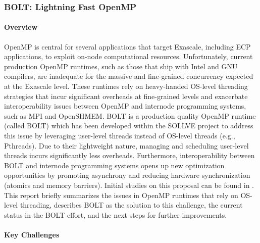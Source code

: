 \subsubsection{ BOLT: Lightning Fast OpenMP}\label{subsubsect:bolt}

\paragraph{Overview}

OpenMP is central for several applications that target Exascale,
including ECP applications, to exploit on-node computational
resources.  Unfortunately, current production OpenMP runtimes, such as
those that ship with Intel and GNU compilers, are inadequate for the
massive and fine-grained concurrency expected at the Exascale level.
These runtimes rely on heavy-handed OS-level threading strategies that
incur significant overheads at fine-grained levels and exacerbate
interoperability issues between OpenMP and internode programming
systems, such as MPI and OpenSHMEM.  BOLT is a production quality
OpenMP runtime (called BOLT) which has been developed within the
SOLLVE project to address this issue by leveraging user-level threads
instead of OS-level threads (e.g., Pthreads).  Due to their
lightweight nature, managing and scheduling user-level threads incurs
significantly less overheads.  Furthermore, interoperability between
BOLT and internode programming systems opens up new optimization
opportunities by promoting asynchrony and reducing hardware
synchronization (atomics and memory barriers).  Initial studies on
this proposal can be found in \cite{amer2018, ccgrid, ppopp}. This
report briefly summarizes the issues in OpenMP runtimes that rely on
OS-level threading, describes BOLT as the solution to this challenge,
the current status in the BOLT effort, and the next steps for further
improvements.

\paragraph{Key Challenges}

